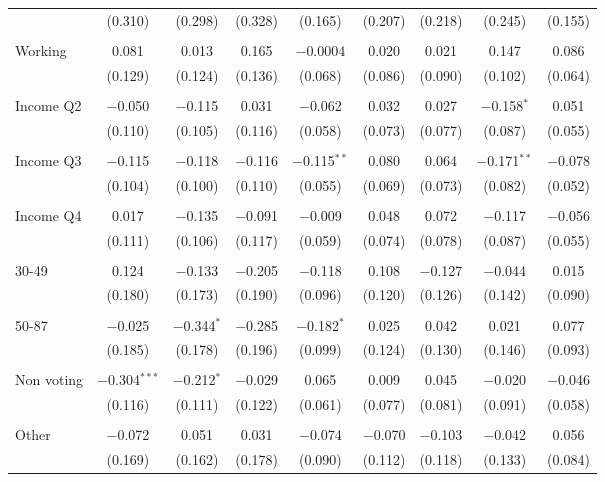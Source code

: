 \begin{tabular}{@{\extracolsep{5pt}}lcccccccc}
  & (0.310) & (0.298) & (0.328) & (0.165) & (0.207) & (0.218) & (0.245) & (0.155) \\ 
  & & & & & & & & \\ 
 Working & 0.081 & 0.013 & 0.165 & $-$0.0004 & 0.020 & 0.021 & 0.147 & 0.086 \\ 
  & (0.129) & (0.124) & (0.136) & (0.068) & (0.086) & (0.090) & (0.102) & (0.064) \\ 
  & & & & & & & & \\ 
 Income Q2 & $-$0.050 & $-$0.115 & 0.031 & $-$0.062 & 0.032 & 0.027 & $-$0.158$^{*}$ & 0.051 \\ 
  & (0.110) & (0.105) & (0.116) & (0.058) & (0.073) & (0.077) & (0.087) & (0.055) \\ 
  & & & & & & & & \\ 
 Income Q3 & $-$0.115 & $-$0.118 & $-$0.116 & $-$0.115$^{**}$ & 0.080 & 0.064 & $-$0.171$^{**}$ & $-$0.078 \\ 
  & (0.104) & (0.100) & (0.110) & (0.055) & (0.069) & (0.073) & (0.082) & (0.052) \\ 
  & & & & & & & & \\ 
 Income Q4 & 0.017 & $-$0.135 & $-$0.091 & $-$0.009 & 0.048 & 0.072 & $-$0.117 & $-$0.056 \\ 
  & (0.111) & (0.106) & (0.117) & (0.059) & (0.074) & (0.078) & (0.087) & (0.055) \\ 
  & & & & & & & & \\ 
 30-49 & 0.124 & $-$0.133 & $-$0.205 & $-$0.118 & 0.108 & $-$0.127 & $-$0.044 & 0.015 \\ 
  & (0.180) & (0.173) & (0.190) & (0.096) & (0.120) & (0.126) & (0.142) & (0.090) \\ 
  & & & & & & & & \\ 
 50-87 & $-$0.025 & $-$0.344$^{*}$ & $-$0.285 & $-$0.182$^{*}$ & 0.025 & 0.042 & 0.021 & 0.077 \\ 
  & (0.185) & (0.178) & (0.196) & (0.099) & (0.124) & (0.130) & (0.146) & (0.093) \\ 
  & & & & & & & & \\ 
 Non voting & $-$0.304$^{***}$ & $-$0.212$^{*}$ & $-$0.029 & 0.065 & 0.009 & 0.045 & $-$0.020 & $-$0.046 \\ 
  & (0.116) & (0.111) & (0.122) & (0.061) & (0.077) & (0.081) & (0.091) & (0.058) \\ 
  & & & & & & & & \\ 
 Other & $-$0.072 & 0.051 & 0.031 & $-$0.074 & $-$0.070 & $-$0.103 & $-$0.042 & 0.056 \\ 
  & (0.169) & (0.162) & (0.178) & (0.090) & (0.112) & (0.118) & (0.133) & (0.084) \\ 

\end{tabular}
